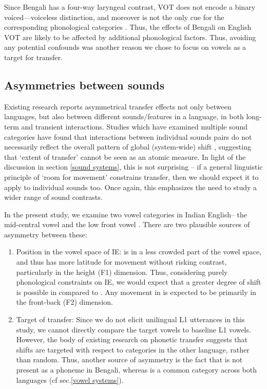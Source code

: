 \documentclass[charis,linguex]{glossa}
\newcommand{\nt}[1]{\textipa{[#1]}} %
\begin{document}
Since Bengali has a four-way laryngeal contrast, VOT does not encode a binary voiced---voiceless distinction, and moreover is not the only cue for the corresponding phonological categories \citep{dmitrieva2020acoustic}. Thus, the effects of Bengali on English VOT are likely to be affected by additional phonological factors. Thus, avoiding any potential confounds was another reason we chose to focus on vowels as a target for transfer. 


\subsection{Asymmetries between sounds}\label{asymmetry between sounds}

Existing research reports asymmetrical transfer effects not only between languages, but also between different sounds/features in a language, in both long-term and transient interactions. Studies which have examined multiple sound categories have found that interactions between individual sounds pairs do not necessarily reflect the overall pattern of global (system-wide) shift \citep{chang2012rapid,elias2017effects}, suggesting that `extent of transfer' cannot be seen as an atomic measure. In light of the discussion in section \ref{sound systems}, this is not surprising -- if a general linguistic principle of `room for movement' constrains transfer, then we should expect it to apply to individual sounds too. Once again, this emphasizes the need to study a wider range of sound contrasts.


In the present study, we examine two vowel categories in Indian English-- the mid-central vowel \nt{2} and the low front vowel \nt{\ae}. There are two plausible sources of asymmetry between these:
\begin{enumerate}
	\item Position in the vowel space of IE: \nt{2} is in a less crowded part of the vowel space, and thus has more latitude for movement without risking contrast, particularly in the height (F1) dimension. Thus, considering purely phonological constraints on IE, we would expect that a greater degree of shift is possible in \nt{2} compared to \nt{\ae}. Any movement in \nt{\ae} is expected to be primarily in the front-back (F2) dimension.
	\item Target of transfer: Since we do not elicit unilingual L1 utterances in this study, we cannot directly compare the target vowels to baseline L1 vowels. However, the body of existing research on phonetic transfer suggests that shifts are targeted with respect to categories in the other language, rather than random. Thus, another source of asymmetry is the fact that \nt{2} is not present as a phoneme in Bengali, whereas \nt{\ae} is a common category across both languages (cf sec.\ref{vowel systems}).
\end{enumerate}
\end{document}
